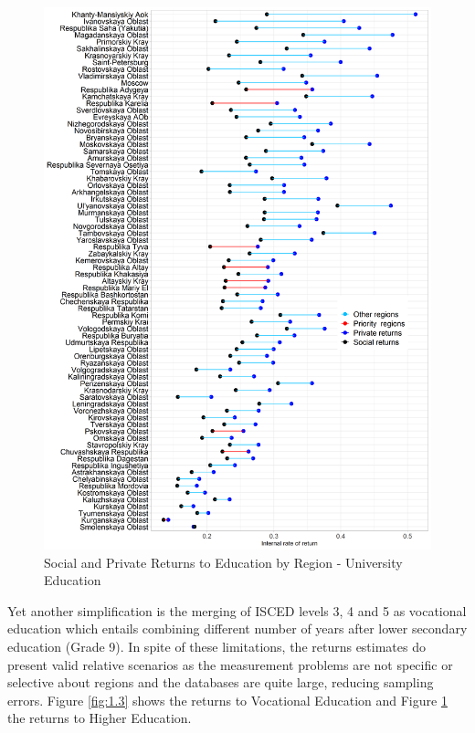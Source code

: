 \documentclass[alpha-refs]{wiley-article-05g}
\begin{document}
\begin{center}
	\begin{figure}[htbp!]
\begin{minipage}[b]{1\linewidth}
			\centering
			\includegraphics[scale=0.52]{returns_by_region_plot1.png}
		\end{minipage}
			\caption{Social and Private Returns to Education by Region - 
			University Education}\label{fig:1.4}
	\end{figure}
\end{center}

\vspace{-2em}

Yet another simplification is the merging of ISCED levels 3, 4 and 5 as vocational education which entails combining different number of years after lower secondary education (Grade 9). In spite of these limitations, the returns estimates do present valid relative scenarios as the measurement problems are not specific or selective about regions and the databases are quite large, reducing sampling errors. Figure \ref{fig:1.3}  shows the returns to Vocational Education and Figure \ref{fig:1.4} the returns to Higher Education. 
\end{document}

